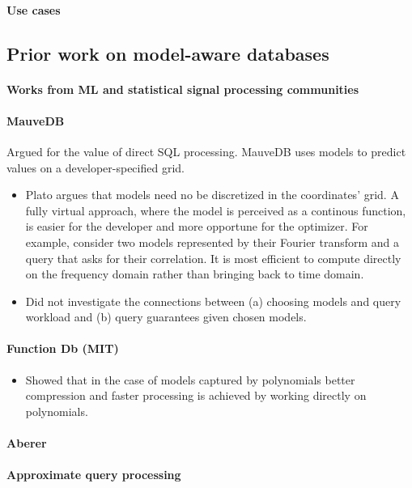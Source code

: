 \paragraph{Use cases}

\subsection{Prior work on model-aware databases}

\paragraph{Works from ML and statistical signal processing communities} 

\paragraph{MauveDB} Argued for the value of direct SQL processing. MauveDB uses models to predict values on a developer-specified grid. 

\begin{itemize}
\item Plato argues that models need no be discretized in the coordinates' grid. A fully virtual approach, where the model is perceived as a continous function, is easier for the developer and more opportune for the optimizer. For example, consider two models represented by their Fourier transform and a query that asks for their correlation. It is most efficient to compute directly on the frequency domain rather than bringing back to time domain.
%
\item Did not investigate the connections between (a) choosing models and query workload and (b) query guarantees given chosen models.
\end{itemize}


\paragraph{Function Db (MIT)} 
\begin{itemize}
\item Showed that in the case of models captured by polynomials better compression and faster processing is achieved by working directly on polynomials.
\end{itemize}


\paragraph{Aberer}


\paragraph{Approximate query processing}
